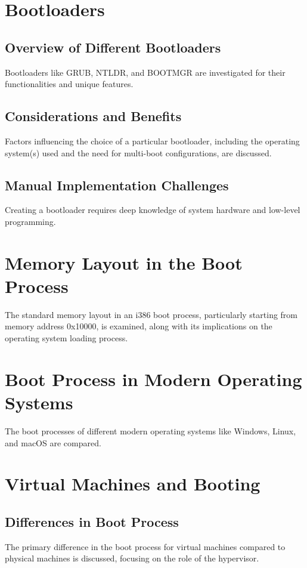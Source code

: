 \documentclass[12pt]{article}
\begin{document}
\section{Bootloaders}
\subsection{Overview of Different Bootloaders}
Bootloaders like GRUB, NTLDR, and BOOTMGR are investigated for their functionalities and unique features.

\subsection{Considerations and Benefits}
Factors influencing the choice of a particular bootloader, including the operating system(s) used and the need for multi-boot configurations, are discussed.

\subsection{Manual Implementation Challenges}
Creating a bootloader requires deep knowledge of system hardware and low-level programming.

\section{Memory Layout in the Boot Process}
The standard memory layout in an i386 boot process, particularly starting from memory address 0x10000, is examined, along with its implications on the operating system loading process.

\section{Boot Process in Modern Operating Systems}
The boot processes of different modern operating systems like Windows, Linux, and macOS are compared.

\section{Virtual Machines and Booting}
\subsection{Differences in Boot Process}
The primary difference in the boot process for virtual machines compared to physical machines is discussed, focusing on the role of the hypervisor.
\end{document}

